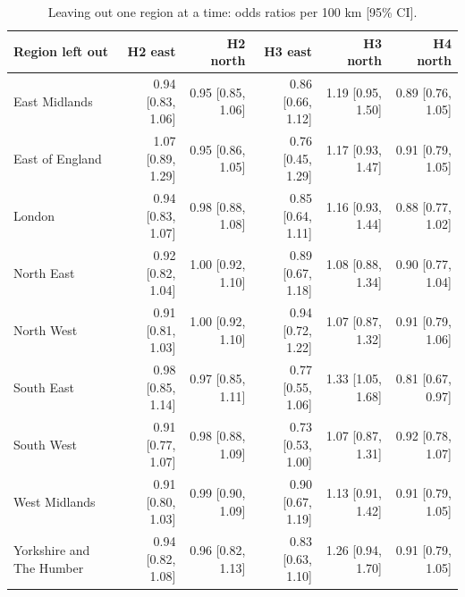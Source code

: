 \documentclass[11pt,a4paper]{article}
\begin{document}
\begin{table}[htbp]\centering\scriptsize\caption{Leaving out one region at a time: odds ratios per 100 km [95\% CI].}\label{tab:loro}\begin{tabular}{lrrrrr}\toprule Region left out & H2 east & H2 north & H3 east & H3 north & H4 north\\\midrule
East Midlands & 0.94 [0.83, 1.06] & 0.95 [0.85, 1.06] & 0.86 [0.66, 1.12] & 1.19 [0.95, 1.50] & 0.89 [0.76, 1.05]\\
East of England & 1.07 [0.89, 1.29] & 0.95 [0.86, 1.05] & 0.76 [0.45, 1.29] & 1.17 [0.93, 1.47] & 0.91 [0.79, 1.05]\\
London & 0.94 [0.83, 1.07] & 0.98 [0.88, 1.08] & 0.85 [0.64, 1.11] & 1.16 [0.93, 1.44] & 0.88 [0.77, 1.02]\\
North East & 0.92 [0.82, 1.04] & 1.00 [0.92, 1.10] & 0.89 [0.67, 1.18] & 1.08 [0.88, 1.34] & 0.90 [0.77, 1.04]\\
North West & 0.91 [0.81, 1.03] & 1.00 [0.92, 1.10] & 0.94 [0.72, 1.22] & 1.07 [0.87, 1.32] & 0.91 [0.79, 1.06]\\
South East & 0.98 [0.85, 1.14] & 0.97 [0.85, 1.11] & 0.77 [0.55, 1.06] & 1.33 [1.05, 1.68] & 0.81 [0.67, 0.97]\\
South West & 0.91 [0.77, 1.07] & 0.98 [0.88, 1.09] & 0.73 [0.53, 1.00] & 1.07 [0.87, 1.31] & 0.92 [0.78, 1.07]\\
West Midlands & 0.91 [0.80, 1.03] & 0.99 [0.90, 1.09] & 0.90 [0.67, 1.19] & 1.13 [0.91, 1.42] & 0.91 [0.79, 1.05]\\
Yorkshire and The Humber & 0.94 [0.82, 1.08] & 0.96 [0.82, 1.13] & 0.83 [0.63, 1.10] & 1.26 [0.94, 1.70] & 0.91 [0.79, 1.05]\\
\bottomrule\end{tabular}\end{table}
\end{document}

